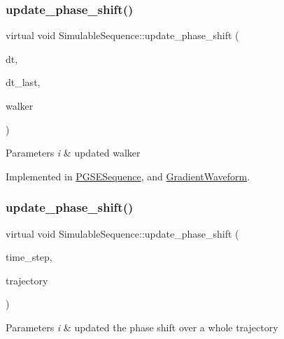 \subsubsection{\texorpdfstring{update\+\_\+phase\+\_\+shift()}{update\_phase\_shift()}\hspace{0.1cm}{\footnotesize\ttfamily [1/2]}}
{\footnotesize\ttfamily virtual void Simulable\+Sequence\+::update\+\_\+phase\+\_\+shift (\begin{DoxyParamCaption}\item[{double}]{dt,  }\item[{double}]{dt\+\_\+last,  }\item[{\hyperlink{class_walker}{Walker}}]{walker }\end{DoxyParamCaption})\hspace{0.3cm}{\ttfamily [pure virtual]}}


\begin{DoxyParams}{Parameters}
{\em i} & updated walker \\
\hline
\end{DoxyParams}


Implemented in \hyperlink{class_p_g_s_e_sequence_a6914efd208eab28a1ee6a3f28ca65478}{P\+G\+S\+E\+Sequence}, and \hyperlink{class_gradient_waveform_a7421301b24b6c98e28ef9430287cdf8e}{Gradient\+Waveform}.

\mbox{\label{class_simulable_sequence_a175197d165ee7852094bc70cadc59589}} 
\subsubsection{\texorpdfstring{update\+\_\+phase\+\_\+shift()}{update\_phase\_shift()}\hspace{0.1cm}{\footnotesize\ttfamily [2/2]}}
{\footnotesize\ttfamily virtual void Simulable\+Sequence\+::update\+\_\+phase\+\_\+shift (\begin{DoxyParamCaption}\item[{double}]{time\+\_\+step,  }\item[{Eigen\+::\+Matrix3\+Xd}]{trajectory }\end{DoxyParamCaption})\hspace{0.3cm}{\ttfamily [pure virtual]}}


\begin{DoxyParams}{Parameters}
{\em i} & updated the phase shift over a whole trajectory \\
\hline
\end{DoxyParams}


